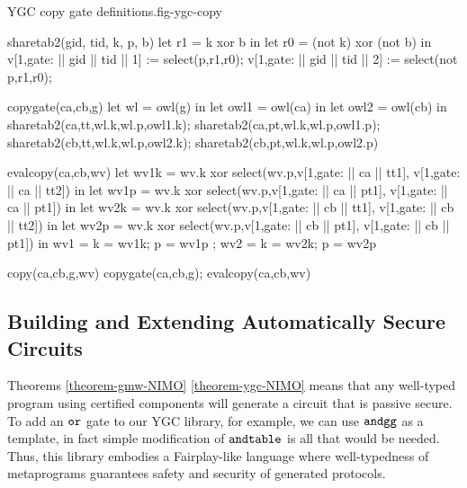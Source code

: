 \begin{fpfig}[t]{YGC copy gate definitions.}{fig-ygc-copy}
  {\footnotesize
    \begin{verbatimtab}
      sharetab2(gid, tid, k, p, b)
      {
        let r1 = k xor b in
        let r0 = (not k) xor (not b) in
        v[1,gate: || gid || tid || 1] := select(p,r1,r0);
        v[1,gate: || gid || tid || 2] := select(not p,r1,r0);
      }
      
      copygate(ca,cb,g)
      {
        let wl = owl(g) in
        let owl1 = owl(ca) in
        let owl2 = owl(cb) in
        sharetab2(ca,tt,wl.k,wl.p,owl1.k); sharetab2(ca,pt,wl.k,wl.p,owl1.p);
        sharetab2(cb,tt,wl.k,wl.p,owl2.k); sharetab2(cb,pt,wl.k,wl.p,owl2.p)
      }
      
      evalcopy(ca,cb,wv)
      {
        let wv1k = wv.k xor select(wv.p,v[1,gate: || ca || tt1], v[1,gate: || ca || tt2]) in
        let wv1p = wv.k xor select(wv.p,v[1,gate: || ca || pt1], v[1,gate: || ca || pt1]) in
        let wv2k = wv.k xor select(wv.p,v[1,gate: || cb || tt1], v[1,gate: || cb || tt2]) in
        let wv2p = wv.k xor select(wv.p,v[1,gate: || cb || pt1], v[1,gate: || cb || pt1]) in
        { wv1 = { k = wv1k; p = wv1p }; wv2 = { k = wv2k; p = wv2p } }  
      }

      copy(ca,cb,g,wv) { copygate(ca,cb,g); evalcopy(ca,cb,wv) } 
    \end{verbatimtab}
  }
\end{fpfig}

\subsection{Building and Extending Automatically Secure Circuits}
\label{section-composition-copy}

Theorems \ref{theorem-gmw-NIMO} \ref{theorem-ygc-NIMO} means that any
well-typed program using certified components will generate a circuit
that is passive secure. To add an $\texttt{or}$ gate to our YGC library,
for example, we can use $\texttt{andgg}$ as a template, in fact simple
modification of $\texttt{andtable}$ is all that would be needed. Thus,
this library embodies a Fairplay-like language where well-typedness of
metaprograms guarantees safety and security of generated protocols.

